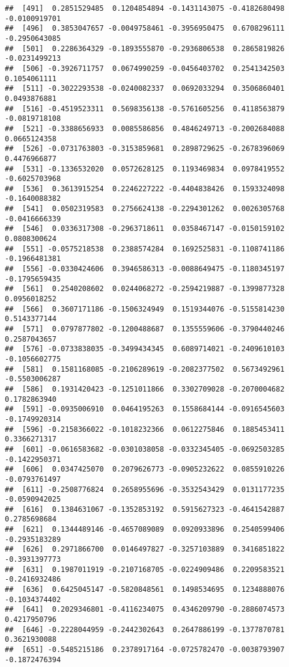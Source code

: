 \documentclass[
]{article}
\begin{document}
\begin{verbatim}
##  [491]  0.2851529485  0.1204854894 -0.1431143075 -0.4182680498 -0.0100919701
##  [496]  0.3853047657 -0.0049758461 -0.3956950475  0.6708296111 -0.2950643085
##  [501]  0.2286364329 -0.1893555870 -0.2936806538  0.2865819826 -0.0231499213
##  [506] -0.3926711757  0.0674990259 -0.0456403702  0.2541342503  0.1054061111
##  [511] -0.3022293538 -0.0240082337  0.0692033294  0.3506860401  0.0493876881
##  [516] -0.4519523311  0.5698356138 -0.5761605256  0.4118563879 -0.0819718108
##  [521] -0.3388656933  0.0085586856  0.4846249713 -0.2002684088  0.0665124358
##  [526] -0.0731763803 -0.3153859681  0.2898729625 -0.2678396069  0.4476966877
##  [531] -0.1336532020  0.0572628125  0.1193469834  0.0978419552 -0.6025703968
##  [536]  0.3613915254  0.2246227222 -0.4404838426  0.1593324098 -0.1640088382
##  [541]  0.0502319583  0.2756624138 -0.2294301262  0.0026305768 -0.0416666339
##  [546]  0.0336317308 -0.2963718611  0.0358467147 -0.0150159102  0.0808300624
##  [551] -0.0575218538  0.2388574284  0.1692525831 -0.1108741186 -0.1966481381
##  [556] -0.0330424606  0.3946586313 -0.0088649475 -0.1180345197 -0.1795659435
##  [561]  0.2540208602  0.0244068272 -0.2594219887 -0.1399877328  0.0956018252
##  [566]  0.3607171186 -0.1506324949  0.1519344076 -0.5155814230  0.5143377144
##  [571]  0.0797877802 -0.1200488687  0.1355559606 -0.3790440246  0.2587043657
##  [576] -0.0733838035 -0.3499434345  0.6089714021 -0.2409610103 -0.1056602775
##  [581]  0.1581168085 -0.2106289619 -0.2082377502  0.5673492961 -0.5503006287
##  [586]  0.1931420423 -0.1251011866  0.3302709028 -0.2070004682  0.1782863940
##  [591] -0.0935006910  0.0464195263  0.1558684144 -0.0916545603 -0.1749920314
##  [596] -0.2158366022 -0.1018232366  0.0612275846  0.1885453411  0.3366271317
##  [601] -0.0616583682 -0.0301038058 -0.0332345405 -0.0692503285 -0.1422950371
##  [606]  0.0347425070  0.2079626773 -0.0905232622  0.0855910226 -0.0793761497
##  [611] -0.2508776824  0.2658955696 -0.3532543429  0.0131177235 -0.0590942025
##  [616]  0.1384631067 -0.1352853192  0.5915627323 -0.4641542887  0.2785698684
##  [621]  0.1344489146 -0.4657089089  0.0920933896  0.2540599406 -0.2935183289
##  [626]  0.2971866700  0.0146497827 -0.3257103889  0.3416851822 -0.3931397773
##  [631]  0.1987011919 -0.2107168705 -0.0224909486  0.2209583521 -0.2416932486
##  [636]  0.6425045147 -0.5820848561  0.1498534695  0.1234888076 -0.1034374402
##  [641]  0.2029346801 -0.4116234075  0.4346209790 -0.2886074573  0.4217950796
##  [646] -0.2228044959 -0.2442302643  0.2647886199 -0.1377870781  0.3621930088
##  [651] -0.5485215186  0.2378917164 -0.0725782470 -0.0038793907 -0.1872476394

\end{verbatim}
\end{document}
